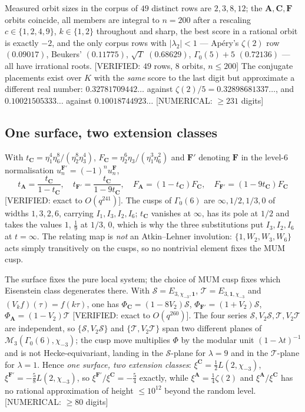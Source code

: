 \documentclass[11pt,reqno]{amsart}
\theoremstyle{plain}
\theoremstyle{definition}
\theoremstyle{remark}
\theoremstyle{plain}
\newcommand{\VerifiedR}[1]{\textup{\textsf{[VERIFIED: #1]}}}
\newcommand{\Numerical}[1]{\textup{\textsf{[NUMERICAL: #1]}}}
\begin{document}
Measured orbit sizes in the corpus of $49$ distinct rows are $2,3,8,12$; the
$\mathbf A,\mathbf C,\mathbf F$ orbits coincide, all members are integral to
$n=200$ after a rescaling $c\in\{1,2,4,9\}$, $k\in\{1,2\}$ throughout and sharp,
the best score in a rational orbit is exactly $-2$, and the only corpus rows with
$|\lambda_2|<1$ --- Ap\'ery's $\zeta(2)$ row $(0.09017)$, Beukers' $(0.11775)$,
$\sqrt T$ $(0.68629)$, $\Gamma_0(5)+5$ $(0.72136)$ --- all have irrational roots.
\VerifiedR{$49$ rows, $8$ orbits, $n\le200$} The conjugate placements exist over
$K$ with the \emph{same} score to the last digit but approximate a different real
number: $0.32781709442\ldots$ against $\zeta(2)/5=0.32898681337\ldots$, and
$0.10021505333\ldots$ against $0.10018744923\ldots$ \Numerical{$\ge231$ digits}

\subsection{One surface, two extension classes}

With $t_{\mathbf C}=\eta_1^4\eta_6^8/(\eta_2^8\eta_3^4)$,
$F_{\mathbf C}=\eta_2^6\eta_3/(\eta_1^3\eta_6^2)$ and $\mathbf F'$ denoting
$\mathbf F$ in the level-$6$ normalisation
$u_n^{\mathbf F'}=(-1)^nu_n^{\mathbf F}$,
\[
t_{\mathbf A}=\frac{t_{\mathbf C}}{1-t_{\mathbf C}},\quad
t_{\mathbf F'}=\frac{t_{\mathbf C}}{1-9t_{\mathbf C}},\quad
F_{\mathbf A}=(1-t_{\mathbf C})F_{\mathbf C},\quad
F_{\mathbf F'}=(1-9t_{\mathbf C})F_{\mathbf C}
\]
\VerifiedR{exact to $O(q^{241})$}. The cusps of $\Gamma_0(6)$ are
$\infty,1/2,1/3,0$ of widths $1,3,2,6$, carrying $I_1,I_3,I_2,I_6$;
$t_{\mathbf C}$ vanishes at $\infty$, has its pole at $1/2$ and takes the values
$1$, $\tfrac19$ at $1/3$, $0$, which is why the three substitutions put
$I_3,I_2,I_6$ at $t=\infty$. The relating map is \emph{not} an Atkin--Lehner
involution: $\{1,W_2,W_3,W_6\}$ acts simply transitively on the cusps, so no
nontrivial element fixes the MUM cusp.

The surface fixes the pure local system; the choice of MUM cusp fixes which
Eisenstein class degenerates there. With $\mathcal S=E_{3,\chi_{-3},\mathbf 1}$,
$\mathcal T=E_{3,\mathbf 1,\chi_{-3}}$ and $(V_kf)(\tau)=f(k\tau)$, one has
$\Phi_{\mathbf C}=(1-8V_2)\mathcal S$, $\Phi_{\mathbf F'}=(1+V_2)\mathcal S$,
$\Phi_{\mathbf A}=(1-V_2)\mathcal T$ \VerifiedR{exact to $O(q^{260})$}. The four
series $\mathcal S,V_2\mathcal S,\mathcal T,V_2\mathcal T$ are independent, so
$\{\mathcal S,V_2\mathcal S\}$ and $\{\mathcal T,V_2\mathcal T\}$ span two
different planes of $\mathcal M_3(\Gamma_0(6),\chi_{-3})$; the cusp move
multiplies $\Phi$ by the modular unit $(1-\lambda t)^{-1}$ and is not
Hecke-equivariant, landing in the $\mathcal S$-plane for $\lambda=9$ and in the
$\mathcal T$-plane for $\lambda=1$. Hence \emph{one surface, two extension
classes}: $\xi^{\mathbf C}=\tfrac12L(2,\chi_{-3})$,
$\xi^{\mathbf F'}=-\tfrac58L(2,\chi_{-3})$, so
$\xi^{\mathbf F'}/\xi^{\mathbf C}=-\tfrac54$ exactly, while
$\xi^{\mathbf A}=\tfrac14\zeta(2)$ and $\xi^{\mathbf A}/\xi^{\mathbf C}$ has no
rational approximation of height $\le10^{12}$ beyond the random level.
\Numerical{$\ge80$ digits}
\end{document}

